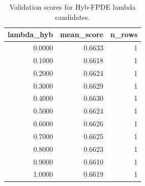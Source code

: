 \begin{table}[t]
\caption{Validation scores for Hyb-FPDE lambda candidates.}
\label{tab:lambda_distribution_computed}
\centering
\begin{tabular}{rrr}
\toprule
lambda\_hyb & mean\_score & n\_rows \\
\midrule
0.0000 & 0.6633 & 1 \\
0.1000 & 0.6618 & 1 \\
0.2000 & 0.6624 & 1 \\
0.3000 & 0.6629 & 1 \\
0.4000 & 0.6630 & 1 \\
0.5000 & 0.6624 & 1 \\
0.6000 & 0.6626 & 1 \\
0.7000 & 0.6625 & 1 \\
0.8000 & 0.6623 & 1 \\
0.9000 & 0.6610 & 1 \\
1.0000 & 0.6619 & 1 \\
\bottomrule
\end{tabular}

\end{table}
